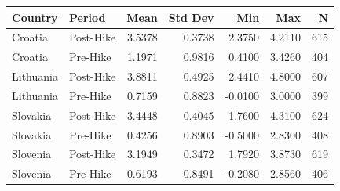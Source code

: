 \begin{tabular}{llrrrrr}
\hline
Country & Period & Mean & Std Dev & Min & Max & N \\
\hline
Croatia & Post-Hike & 3.5378 & 0.3738 & 2.3750 & 4.2110 & 615 \\
Croatia & Pre-Hike & 1.1971 & 0.9816 & 0.4100 & 3.4260 & 404 \\
Lithuania & Post-Hike & 3.8811 & 0.4925 & 2.4410 & 4.8000 & 607 \\
Lithuania & Pre-Hike & 0.7159 & 0.8823 & -0.0100 & 3.0000 & 399 \\
Slovakia & Post-Hike & 3.4448 & 0.4045 & 1.7600 & 4.3100 & 624 \\
Slovakia & Pre-Hike & 0.4256 & 0.8903 & -0.5000 & 2.8300 & 408 \\
Slovenia & Post-Hike & 3.1949 & 0.3472 & 1.7920 & 3.8730 & 619 \\
Slovenia & Pre-Hike & 0.6193 & 0.8491 & -0.2080 & 2.8560 & 406 \\
\hline
\end{tabular}
